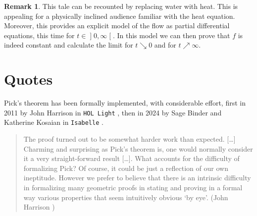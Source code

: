 \documentclass[a4paper]{amsart}
\numberwithin{equation}{section}
\theoremstyle{plain}
\theoremstyle{definition}
\newtheorem{remark}[theorem]{Remark}
\newcommand{\ee}[2]{\mathopen] #1, #2 \mathclose[}
\DeclareMathOperator{\vol}{vol}
\begin{document}
\begin{remark}
  This tale can be recounted by replacing water with heat.
  This is appealing for a physically inclined audience
  familiar with the heat equation. %
  Moreover, this provides an explicit model of the flow
  as partial differential equations, this time for $t \in \ee{0}{\infty}$.
  In this model %
  we can then prove that $f$ is indeed constant
  and calculate the limit for $t \searrow 0$ and for $t \nearrow \infty$.
\end{remark}






\setcounter{section}{16}
\section{Quotes}

Pick's theorem has been formally implemented, with considerable effort,
first in 2011 by John Harrison in \texttt{HOL\,Light} \cite{Harrison:2011},
then in 2024 by Sage Binder and Katherine Kosaian in \texttt{Isabelle}
\cite{Binder:Kosaian:2024}.

\begin{quote}
  The proof turned out to be somewhat harder work than expected. [\dots]
  Charming and surprising as Pick's theorem is, one would normally consider it
  a very straight-forward result [\dots].
  What accounts for the difficulty of formalizing Pick?
  Of course, it could be just a reflection of our own ineptitude.
  However we prefer to believe that there is an intrinsic difficulty
  in formalizing many geometric proofs in stating and proving
  in a formal way various properties that seem intuitively obvious ‘by eye’.
  (John Harrison \cite{Harrison:2011})
\end{quote}
\end{document}
